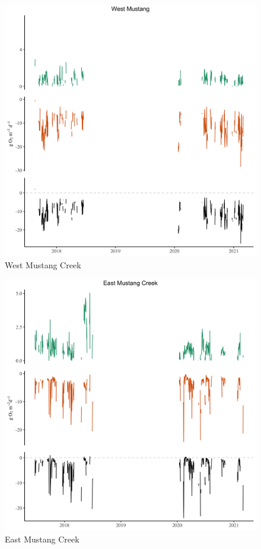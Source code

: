 \begin{figure}[htb]
\begin{center}
\includegraphics[scale=0.2]{Figs/WMC.png}
\caption{West Mustang Creek}
\label{Fig:WMC}
\end{center}
\end{figure}

\begin{figure}[htb]
\begin{center}
\includegraphics[scale=0.2]{Figs/EMC.png}
\caption{East Mustang Creek}
\label{Fig:EMC}
\end{center}
\end{figure}

\endinput
